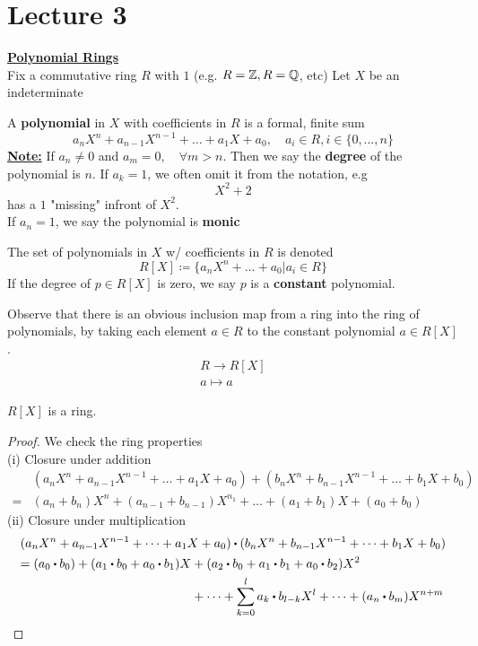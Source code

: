 \documentclass[../Main.tex]{subfiles}
\begin{document}
	\chapter{Lecture 3}
	\underline{\textbf{\large{Polynomial Rings}}}\\
	Fix a commutative ring $R$ with $1$ (e.g. $R=\mathbb{Z}, R=\mathbb{Q}$, etc)
	Let $X$ be an indeterminate
	\begin{dfn}[title = Polynomial Ring]
		A \textbf{polynomial} in $X$ with coefficients in $R$ is a formal, finite sum
		\[a_nX^n+a_{n-1}X^{n-1}+\dots+a_1X+a_0, \quad a_i\in R, i\in \{0, \dots, n\}\]
		\textbf{\underline{Note:}} If $a_n\ne 0$ and $a_m=0, \quad \forall m>n$. Then we say the \textbf{degree} of the polynomial is $n$.
		If $a_k=1$, we often omit it from the notation, e.g
		\[X^2+2\]
		has a $1$ "missing" infront of $X^2$.\\
		If $a_n=1$, we say the polynomial is \textbf{monic} 
	\end{dfn}
	\begin{dfn}[title=Constant Polynomial]
		The set of polynomials in $X$ w/ coefficients in $R$ is denoted
		\[R[X] \coloneqq \{a_nX^n+\dots+a_0|a_i \in R\} \]
		If the degree of $p\in R[X]$ is zero, we say $p$ is a \textbf{constant} polynomial.
	\end{dfn}
	Observe that there is an obvious inclusion map from a ring into the ring of polynomials, by taking each element $a\in R$ to the constant polynomial $a\in R[X]$.
	\begin{align*}
		R \to R[X]\\
		a\mapsto a
	\end{align*}
	\begin{claim}
		$R[X]$ is a ring.
	\end{claim}
	\begin{proof}We check the ring properties \\
		(i) Closure under addition
		\begin{align*}
		&(a_nX^n+a_{n-1}X^{n-1}+\dots+ a_1X+a_0) + (b_nX^n+b_{n-1}X^{n-1}+\dots+b_1X+b_0) \\
		=& (a_n+b_n)X^n +(a_{n-1}+b_{n-1})X^{n_1}+\dots+(a_1+b_1)X+(a_0+b_0)
		\end{align*}
		(ii) Closure under multiplication
		\begin{align*}
			&(a_nX^n+a_{n-1}X^{n-1}+\dots+ a_1X+a_0) \rdot (b_nX^n+b_{n-1}X^{n-1}+\dots+b_1X+b_0) \\
			& \begin{aligned}=(a_0\rdot b_0)+(a_1\rdot b_0+a_0\rdot b_1)X &+ (a_2\rdot b_0 + a_1\rdot b_1+a_0\rdot b_2)X^2\\
			&+\dots+\sum_{k=0}^{l}a_k\rdot b_{l-k} X^l + \dots + (a_n\rdot b_m)X^{n+m}
			\end{aligned}
		\end{align*}
	\end{proof}
\end{document}
